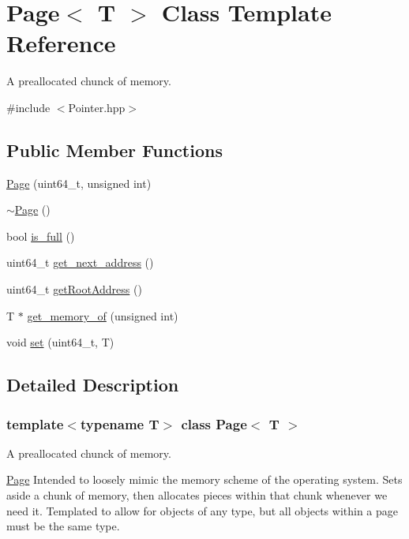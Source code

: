 \hypertarget{class_page}{}\section{Page$<$ T $>$ Class Template Reference}
\label{class_page}


A preallocated chunck of memory.  




{\ttfamily \#include $<$Pointer.\+hpp$>$}

\subsection*{Public Member Functions}
\begin{DoxyCompactItemize}
\item 
\hyperlink{class_page_ac9e22e2694dfa6a7dc4f80166c0217c5}{Page} (uint64\+\_\+t, unsigned int)
\item 
\hyperlink{class_page_a7312a131c7f52718cf4f2b6f487d31bf}{$\sim$\+Page} ()
\item 
bool \hyperlink{class_page_a8c27abd6fb2ce55c05b065584b4bcc75}{is\+\_\+full} ()
\item 
uint64\+\_\+t \hyperlink{class_page_ae6ac153d53ddb0493a4fff270dfa42cb}{get\+\_\+next\+\_\+address} ()
\item 
uint64\+\_\+t \hyperlink{class_page_a438a928e0ce67dc404f183678eb533ec}{get\+Root\+Address} ()
\item 
T $\ast$ \hyperlink{class_page_af540699e2f459eccb3a4991c0b509bce}{get\+\_\+memory\+\_\+of} (unsigned int)
\item 
void \hyperlink{class_page_a4de67b2afdfe14758388f745a8a99d56}{set} (uint64\+\_\+t, T)
\end{DoxyCompactItemize}


\subsection{Detailed Description}
\subsubsection*{template$<$typename T$>$\newline
class Page$<$ T $>$}

A preallocated chunck of memory. 

\hyperlink{class_page}{Page} Intended to loosely mimic the memory scheme of the operating system. Sets aside a chunk of memory, then allocates pieces within that chunk whenever we need it. Templated to allow for objects of any type, but all objects within a page must be the same type. 

